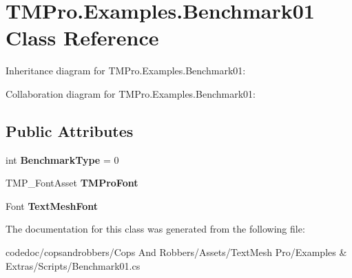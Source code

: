 \hypertarget{classTMPro_1_1Examples_1_1Benchmark01}{}\section{T\+M\+Pro.\+Examples.\+Benchmark01 Class Reference}
\label{classTMPro_1_1Examples_1_1Benchmark01}


Inheritance diagram for T\+M\+Pro.\+Examples.\+Benchmark01\+:


Collaboration diagram for T\+M\+Pro.\+Examples.\+Benchmark01\+:
\subsection*{Public Attributes}
\begin{DoxyCompactItemize}
\item 
\mbox{\label{classTMPro_1_1Examples_1_1Benchmark01_adb8b4f7e8213b2c146e8d8e1b88180dc}} 
int {\bfseries Benchmark\+Type} = 0
\item 
\mbox{\label{classTMPro_1_1Examples_1_1Benchmark01_ac150b09608aaf2f8e06fa0703496c864}} 
T\+M\+P\+\_\+\+Font\+Asset {\bfseries T\+M\+Pro\+Font}
\item 
\mbox{\label{classTMPro_1_1Examples_1_1Benchmark01_a8e58d54eac5c21bc055263ff7689322f}} 
Font {\bfseries Text\+Mesh\+Font}
\end{DoxyCompactItemize}


The documentation for this class was generated from the following file\+:\begin{DoxyCompactItemize}
\item 
codedoc/copsandrobbers/\+Cops And Robbers/\+Assets/\+Text\+Mesh Pro/\+Examples \& Extras/\+Scripts/Benchmark01.\+cs\end{DoxyCompactItemize}
